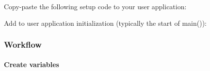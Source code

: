 \begin{DoxyCodeInclude}
\end{DoxyCodeInclude}
 Copy-\/paste the following setup code to your user application\+: 
\begin{DoxyCodeInclude}
\end{DoxyCodeInclude}
 Add to user application initialization (typically the start of {\ttfamily main()})\+: 
\begin{DoxyCodeInclude}
\end{DoxyCodeInclude}
 \hypertarget{asfdoc_sam0_sercom_usart_dma_use_case_asfdoc_sam0_usart_dma_use_case_setup_flow}{}\subsubsection{Workflow}\label{asfdoc_sam0_sercom_usart_dma_use_case_asfdoc_sam0_usart_dma_use_case_setup_flow}
\hypertarget{asfdoc_sam0_sercom_usart_dma_use_case_asfdoc_sam0_usart_dma_use_case_setup_flow_inst}{}\paragraph{Create variables}\label{asfdoc_sam0_sercom_usart_dma_use_case_asfdoc_sam0_usart_dma_use_case_setup_flow_inst}

